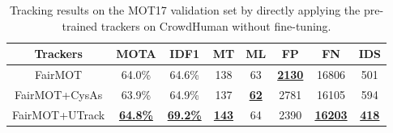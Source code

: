 \documentclass[final,1p,times,twocolumn]{elsarticle}
\begin{document}
	\begin{table}
		\caption{Tracking results on the MOT17 validation set by directly applying the pre-trained trackers on CrowdHuman \cite{shao2018crowdhuman} without fine-tuning. }
		\setlength{\tabcolsep}{1.7pt}
		\centering
\scriptsize
		\begin{tabular}{c|c|c|c|c|c|c|c}
			\hline
			Trackers  &MOTA &IDF1  &MT &ML &FP &FN  &IDS \\
			\hline
			FairMOT \cite{zhang2020fairmot} &64.0\% &64.6\% &138 &63 &\underline{\bf2130} &16806 &501 \\
			FairMOT+CysAs \cite{wang2020cycas} &63.9\% &64.9\% &137 &\underline{\bf62} &2781 &16105 &594  \\
			FairMOT+UTrack &\underline{\bf64.8\%} &\underline{\bf69.2\%} &\underline{\bf143} &64 &2390 &\underline{\bf16203} &\underline{\bf418}  \\
			\hline
		\end{tabular}
		\label{table_pretrain_on_crowdhuman_no_ft}
	\end{table}	
	
	
	
\end{document}
